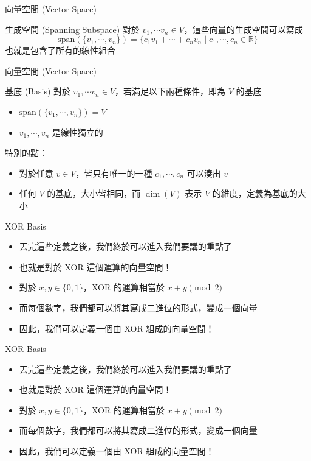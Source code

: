\documentclass[aspectratio=169]{beamer}
\begin{document}
    \begin{frame}{向量空間 (Vector Space)}
        \begin{block}{生成空間 (Spanning Subspace)}
            對於 $v_1, \cdots v_n \in V$，這些向量的生成空間可以寫成
            $$\text{span}(\{v_1,\cdots,v_n\}) = \{c_1v_1+\cdots+c_nv_n \mid c_1, \cdots, c_n \in \mathbb{R}\}$$
            也就是包含了所有的線性組合
        \end{block}
    \end{frame}
    
    \begin{frame}{向量空間 (Vector Space)}
        \begin{block}{基底 (Basis)}
            對於 $v_1, \cdots v_n \in V$，若滿足以下兩種條件，即為 $V$ 的基底
            \begin{itemize}
                \item $\text{span}(\{v_1,\cdots,v_n\})  = V$
                \item $v_1,\cdots,v_n$ 是線性獨立的
            \end{itemize} 
            特別的點：
            \begin{itemize}
                \item 對於任意 $v \in V$，皆只有唯一的一種 $c_1, \cdots, c_n$ 可以湊出 $v$
                \item 任何 $V$ 的基底，大小皆相同，而 $\dim(V)$ 表示 $V$ 的維度，定義為基底的大小 
            \end{itemize} 
        \end{block}
    \end{frame}
    
    \begin{frame}{XOR Basis}
        \begin{itemize}
            \item 丟完這些定義之後，我們終於可以進入我們要講的重點了
            \item 也就是對於 XOR 這個運算的向量空間！
            \item 對於 $x,y \in \{0,1\}$，XOR 的運算相當於 $x+y \pmod 2$
            \item 而每個數字，我們都可以將其寫成二進位的形式，變成一個向量
            \item 因此，我們可以定義一個由 XOR 組成的向量空間！
        \end{itemize}
    \end{frame}
    
    \begin{frame}{XOR Basis}
        \begin{itemize}
            \item 丟完這些定義之後，我們終於可以進入我們要講的重點了
            \item 也就是對於 XOR 這個運算的向量空間！
            \item 對於 $x,y \in \{0,1\}$，XOR 的運算相當於 $x+y \pmod 2$
            \item 而每個數字，我們都可以將其寫成二進位的形式，變成一個向量
            \item 因此，我們可以定義一個由 XOR 組成的向量空間！
        \end{itemize}
    \end{frame}
    
\end{document}
